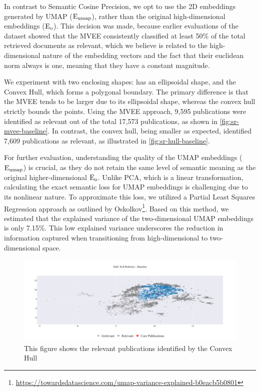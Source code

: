 In contrast to Semantic Cosine Precision, we opt to use the 2D embeddings generated by UMAP ($\mathop{}\!\mathrm{E_{umap}}$), rather than the original high-dimensional embeddings ($\mathop{}\!\mathrm{E_{o}}$). This decision was made, because earlier evaluations of the dataset showed that the MVEE consistently classified at least 50\% of the total retrieved documents as relevant, which we believe is related to the high-dimensional nature of the embedding vectors and the fact that their euclidean norm always is one, meaning that they have a constant magnitude.

We experiment with two enclosing shapes: has an ellipsoidal shape, and the Convex Hull, which forms a polygonal boundary.  The primary difference is that the MVEE tends to be larger due to its ellipsoidal shape, whereas the convex hull strictly bounds the points. Using the MVEE approach, 9,595 publications were identified as relevant out of the total 17,573 publications, as shown in \autoref{fig:sr-mvee-baseline}. In contrast, the convex hull, being smaller as expected, identified 7,609 publications as relevant, as illustrated in \autoref{fig:sr-hull-baseline}.

For further evaluation, understanding the quality of the UMAP embeddings ($\mathop{}\!\mathrm{E_{umap}}$) is crucial, as they do not retain the same level of semantic meaning as the original higher-dimensional $\mathop{}\!\mathrm{E_{o}}$. Unlike PCA, which is a linear transformation, calculating the exact semantic loss for UMAP embeddings is challenging due to its nonlinear nature. To approximate this loss, we utilized a Partial Least Squares Regression approach as outlined by Oskolkov\footnote{\url{https://towardsdatascience.com/umap-variance-explained-b0eacb5b0801}}. Based on this method, we estimated that the explained variance of the two-dimensional UMAP embeddings is only 7.15\%. This low explained variance underscores the reduction in information captured when transitioning from high-dimensional to two-dimensional space.

\begin{figure}
	\hspace*{-1cm}	
	\includegraphics[scale=0.45]{pics/sr-hull-baseline.pdf}
	\caption[Semantic Cosine Threshold: Empirical Analysis]{This figure shows the relevant publications identified by the Convex Hull}\label{fig:sr-hull-baseline}
\end{figure}


